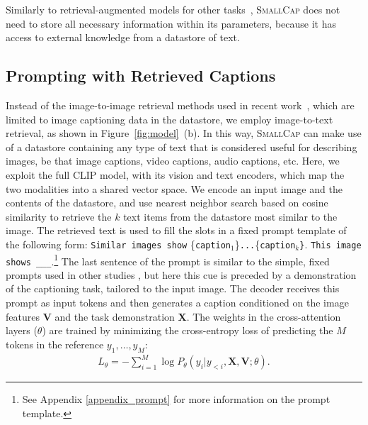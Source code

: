 \documentclass[10pt,twocolumn,letterpaper]{article}
\newcommand{\model}{\textsc{SmallCap}\xspace}
\begin{document}

Similarly to retrieval-augmented models for other tasks~\cite{li2022survey,rag,izacard2022few, wang-etal-2022-training}, \model does not need to store all necessary information within its parameters, because it has access to external knowledge from a datastore of text. 

\subsection{Prompting with Retrieved Captions}
\label{datastore_explained}

Instead of the image-to-image retrieval methods used in recent work~\cite{sarto2022retrieval}, which are limited to image captioning data in the datastore, we employ image-to-text retrieval, as shown in Figure~\ref{fig:model}~(b). In this way, \model can make use of a datastore containing any type of text that is considered useful for describing images, be that image captions, video captions, audio captions, etc.  Here, we exploit the full CLIP model, with its vision and text encoders, which map the two modalities into a shared vector space. We encode an input image and the contents of the datastore, and use nearest neighbor search based on cosine similarity to retrieve the $k$ text items from the datastore most similar to the image. The retrieved text is used to fill the slots in a fixed prompt template of the following form: \texttt{Similar images show} \{\texttt{caption$_1$}\}\texttt{...}\{\texttt{caption$_k$\}}. \texttt{This image shows \_\_\_}.\footnote{See Appendix \ref{appendix_prompt} for more information on the prompt template.} 
The last sentence of the prompt is similar to the simple, fixed prompts used in other studies \cite{li2022blip}, but here this cue is preceded by a demonstration of the captioning task, tailored to the input image. The decoder receives this prompt as input tokens and then generates a caption conditioned on the image features \textbf{V} and the task demonstration \textbf{X}. The weights in the cross-attention layers ($\theta$) are trained by minimizing the cross-entropy loss of predicting the $M$ tokens in the reference $y_1,\dots,y_M$:
%
\begin{align}\label{eqatt1}
L_{\theta}=-\sum_{i=1}^{M}\log P_{\theta}(y_{i}| y_{<i}, \textbf{X}, \textbf{V}; \theta).
\end{align}
\end{document}
